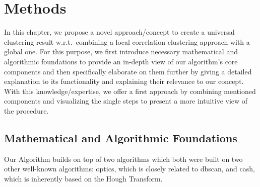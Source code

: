 \chapter{Methods}\label{ch:Methods}
In this chapter, we propose a novel approach/concept to create a universal clustering result w.r.t.\ combining a local correlation clustering approach with a global one. For this purpose, we first introduce necessary mathematical and algorithmic foundations to provide an in-depth view of our algorithm's core components and then specifically elaborate on them further by giving a detailed explanation to its functionality and explaining their relevance to our concept. With this knowledge/expertise, we offer a first approach by combining mentioned components and visualizing the single steps to present a more intuitive view of the procedure. 




\section{Mathematical and Algorithmic Foundations}
\label{sec:Foundations}
Our Algorithm builds on top of two algorithms which both were built on two other well-known algorithms: \gls{optics}, which is closely related to \gls{dbscan}, and \gls{cash}, which is inherently based on the Hough Transform.
